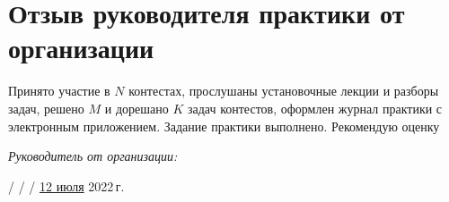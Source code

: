 \section{Отзыв руководителя практики от организации}

Принято участие в $N$ контестах, прослушаны установочные лекции и разборы задач, решено $M$ и дорешано $K$ задач контестов, оформлен журнал практики с электронным приложением. Задание практики выполнено. Рекомендую оценку

\vspace{10pt}

\textit{Руководитель от организации:}

 /  /  / \underline{12 июля} 2022\,г.

\pagebreak
